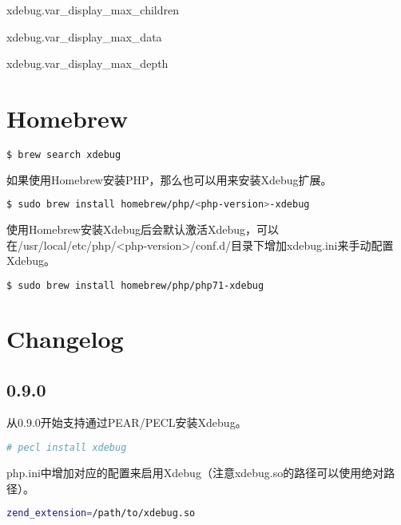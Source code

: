 \begin{compactitem}
\item xdebug.var\_display\_max\_children
\item xdebug.var\_display\_max\_data
\item xdebug.var\_display\_max\_depth
\end{compactitem}



\section{Homebrew}


\begin{lstlisting}[language=bash]
$ brew search xdebug
\end{lstlisting}

如果使用Homebrew安装PHP，那么也可以用来安装Xdebug扩展。

\begin{lstlisting}[language=bash]
$ sudo brew install homebrew/php/<php-version>-xdebug
\end{lstlisting}

使用Homebrew安装Xdebug后会默认激活Xdebug，可以在/usr/local/etc/php/<php-version>/conf.d/目录下增加xdebug.ini来手动配置Xdebug。

\begin{lstlisting}[language=bash]
$ sudo brew install homebrew/php/php71-xdebug
\end{lstlisting}



\section{Changelog}


\subsection{0.9.0}

从0.9.0开始支持通过PEAR/PECL安装Xdebug。


\begin{lstlisting}[language=bash]
# pecl install xdebug
\end{lstlisting}

php.ini中增加对应的配置来启用Xdebug（注意xdebug.so的路径可以使用绝对路径）。

\begin{lstlisting}[language=bash]
zend_extension=/path/to/xdebug.so
\end{lstlisting}

